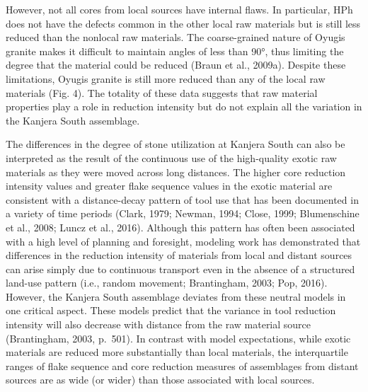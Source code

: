 \documentclass[]{elsarticle} %
\begin{document}
However, not all cores from local sources have internal flaws. In
particular, HPh does not have the defects common in the other local raw
materials but is still less reduced than the nonlocal raw materials. The
coarse-grained nature of Oyugis granite makes it difficult to maintain
angles of less than 90°, thus limiting the degree that the material
could be reduced (\hspace{0pt}Braun et al., 2009a\hspace{0pt}). Despite
these limitations, Oyugis granite is still more reduced than any of the
local raw materials (\hspace{0pt}Fig. 4\hspace{0pt}). The totality of
these data suggests that raw material properties play a role in
reduction intensity but do not explain all the variation in the Kanjera
South assemblage.

The differences in the degree of stone utilization at Kanjera South can
also be interpreted as the result of the continuous use of the
high-quality exotic raw materials as they were moved across long
distances. The higher core reduction intensity values and greater flake
sequence values in the exotic material are consistent with a
distance-decay pattern of tool use that has been documented in a variety
of time periods (\hspace{0pt}Clark, 1979\hspace{0pt};
\hspace{0pt}Newman, 1994\hspace{0pt}; \hspace{0pt}Close,
1999\hspace{0pt}; \hspace{0pt}Blumenschine et al., 2008\hspace{0pt};
\hspace{0pt}Luncz et al., 2016\hspace{0pt}). Although this pattern has
often been associated with a high level of planning and foresight,
modeling work has demonstrated that differences in the reduction
intensity of materials from local and distant sources can arise simply
due to continuous transport even in the absence of a structured land-use
pattern (i.e., random movement; \hspace{0pt}Brantingham,
2003\hspace{0pt}; \hspace{0pt}Pop, 2016\hspace{0pt}). However, the
Kanjera South assemblage deviates from these neutral models in one
critical aspect. These models predict that the variance in tool
reduction intensity will also decrease with distance from the raw
material source (\hspace{0pt}Brantingham, 2003\hspace{0pt}, p.~501). In
contrast with model expectations, while exotic materials are reduced
more substantially than local materials, the interquartile ranges of
flake sequence and core reduction measures of assemblages from distant
sources are as wide (or wider) than those associated with local sources.
\end{document}
